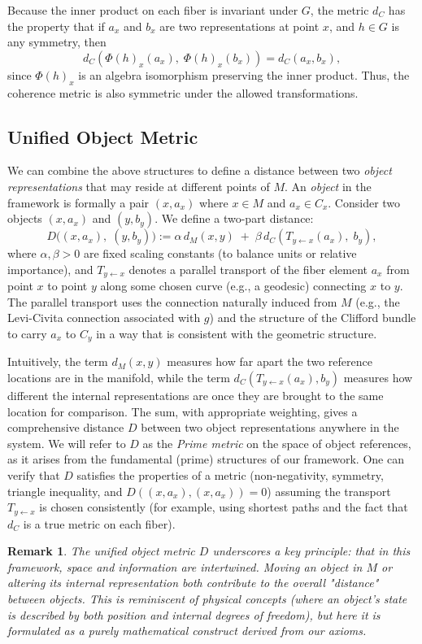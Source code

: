 \documentclass[11pt]{article}
\newtheorem*{remark}{Remark}
\begin{document}
Because the inner product on each fiber is invariant under $G$, the metric $d_C$ has the property that if $a_x$ and $b_x$ are two representations at point $x$, and $h \in G$ is any symmetry, then 
\[d_C(\Phi(h)_x(a_x),\; \Phi(h)_x(b_x)) = d_C(a_x,b_x),\] 
since $\Phi(h)_x$ is an algebra isomorphism preserving the inner product. Thus, the coherence metric is also symmetric under the allowed transformations.

\subsection{Unified Object Metric}
We can combine the above structures to define a distance between two \emph{object representations} that may reside at different points of $M$. An \emph{object} in the framework is formally a pair $(x, a_x)$ where $x \in M$ and $a_x \in C_x$. Consider two objects $(x, a_x)$ and $(y, b_y)$. We define a two-part distance:
\[ D\big((x,a_x),\; (y,b_y)\big) := \alpha\, d_M(x,y) \;+\; \beta\, d_C(T_{y\leftarrow x}(a_x),\; b_y), \]
where $\alpha, \beta > 0$ are fixed scaling constants (to balance units or relative importance), and $T_{y\leftarrow x}$ denotes a parallel transport of the fiber element $a_x$ from point $x$ to point $y$ along some chosen curve (e.g., a geodesic) connecting $x$ to $y$. The parallel transport uses the connection naturally induced from $M$ (e.g., the Levi-Civita connection associated with $g$) and the structure of the Clifford bundle to carry $a_x$ to $C_y$ in a way that is consistent with the geometric structure.

Intuitively, the term $d_M(x,y)$ measures how far apart the two reference locations are in the manifold, while the term $d_C(T_{y\leftarrow x}(a_x), b_y)$ measures how different the internal representations are once they are brought to the same location for comparison. The sum, with appropriate weighting, gives a comprehensive distance $D$ between two object representations anywhere in the system. We will refer to $D$ as the \emph{Prime metric} on the space of object references, as it arises from the fundamental (prime) structures of our framework. One can verify that $D$ satisfies the properties of a metric (non-negativity, symmetry, triangle inequality, and $D((x,a_x),(x,a_x))=0$) assuming the transport $T_{y\leftarrow x}$ is chosen consistently (for example, using shortest paths and the fact that $d_C$ is a true metric on each fiber).

\begin{remark}
The unified object metric $D$ underscores a key principle: that in this framework, \emph{space and information are intertwined}. Moving an object in $M$ or altering its internal representation both contribute to the overall "distance" between objects. This is reminiscent of physical concepts (where an object's state is described by both position and internal degrees of freedom), but here it is formulated as a purely mathematical construct derived from our axioms.
\end{remark}
\end{document}
